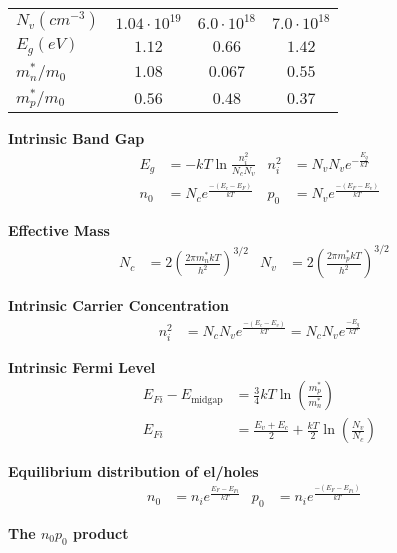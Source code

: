 \documentclass[a4paper, fontsize=8pt, landscape, DIV=1]{scrartcl}
\begin{document}
\begin{multicols*}{4}
\begin{tabular}[h]{l c c c}
        $N_v(cm^{-3})$    & $1.04\cdot 10^{19}$ & $6.0\cdot 10^{18}$  & $7.0\cdot 10^{18}$ \\
        $E_g (eV)$        & $1.12$ & $0.66$ & $1.42$ \\
        $m_n^*/m_0$       & $1.08$ & $0.067$ & $0.55$\\
        $m_p^*/m_0$       & $0.56$ & $0.48$ & $0.37$\\
      \end{tabular}

    \textbf{Intrinsic Band Gap} \\
      \begin{align*}
        E_g &= -kT\ln\frac{n_i^2}{N_c N_v} &
        n_i^2 &= N_v N_v e^{-\frac{E_g}{kT}} \\
        n_0 &= N_ce^{\frac{-(E_c-E_F)}{kT}} &
        p_0 &= N_ve^{\frac{-(E_F-E_v)}{kT}}
      \end{align*}

    \textbf{Effective Mass} \\
      \begin{align*}
        N_c &= 2\left(\frac{2\pi m_n^*kT}{h^2}\right)^{3/2} &
        N_v &= 2\left(\frac{2\pi m_p^*kT}{h^2}\right)^{3/2} &
      \end{align*}

    \textbf{Intrinsic Carrier Concentration} \\
      \begin{align*}
        n_i^2 &= N_cN_ve^{\frac{-(E_c-E_v)}{kT}} = N_cN_ve^{\frac{-E_g}{kT}}
      \end{align*}

    \textbf{Intrinsic Fermi Level} \\
      \begin{align*}
        E_{Fi} - E_{\text{midgap}} &= \frac{3}{4}kT\ln\left(\frac{m_p^*}{m_n^*}\right) \\
        E_{Fi} &= \frac{E_v+E_c}{2} + \frac{kT}{2}\ln\left(\frac{N_v}{N_c}\right)
      \end{align*}

    \textbf{Equilibrium distribution of el/holes} \\
      \begin{align*}
        n_0 &= n_i e^{\frac{E_F-E_{Fi}}{kT}} &
        p_0 &= n_i e^{\frac{-(E_F-E_{Fi})}{kT}} &
      \end{align*}

    \textbf{The $n_0p_0$ product} \\


\end{multicols*}
\end{document}
